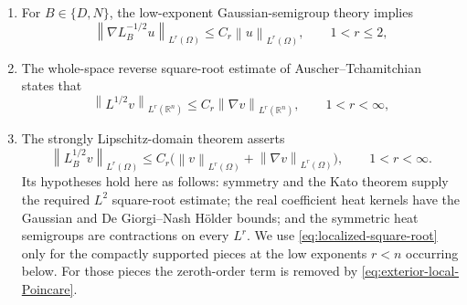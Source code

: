 \documentclass[12pt]{amsart}
\newcommand\R{\mathbb{R}}
\newcommand{\norm}[2]{\left\lVert #1\right\rVert_{#2}}
\theoremstyle{remark}
\begin{document}
\begin{enumerate}[label=\textup{(\roman*)},leftmargin=*]
\item For $B\in\{D,N\}$, the low-exponent Gaussian-semigroup theory
\cite{CoulhonDuong,Sikora} implies
\begin{equation}\label{eq:exterior-low-Riesz}
 \norm{\nabla L_B^{-1/2}u}{L^r(\Omega)}
 \leq C_r\norm u{L^r(\Omega)},\qquad 1<r\leq2,
\end{equation}
\item The whole-space reverse square-root estimate of
Auscher--Tchamitchian~\cite{AuscherTchamitchian98} states that
\begin{equation}\label{eq:whole-space-reverse}
 \norm{L^{1/2}v}{L^r(\R^n)}
 \leq C_r\norm{\nabla v}{L^r(\R^n)},\qquad 1<r<\infty,
\end{equation}
\item The strongly Lipschitz-domain theorem
\cite[Theorem~1]{AuscherTchamitchian01} asserts
\begin{equation}\label{eq:localized-square-root}
 \norm{L_B^{1/2}v}{L^r(\Omega)}
 \leq C_r\bigl(\norm v{L^r(\Omega)}
                    +\norm{\nabla v}{L^r(\Omega)}\bigr),
 \qquad 1<r<\infty.
\end{equation}
Its hypotheses hold here as follows: symmetry and the
Kato theorem supply the required $L^2$ square-root estimate; the real
coefficient heat kernels have the Gaussian and De Giorgi--Nash H\"older
bounds; and the symmetric heat semigroups are contractions on every
$L^r$.  We use \eqref{eq:localized-square-root} only for the compactly
supported pieces at the low exponents \(r<n\) occurring below.  For those
pieces the zeroth-order term is removed by
\eqref{eq:exterior-local-Poincare}.


\end{enumerate}
\end{document}
